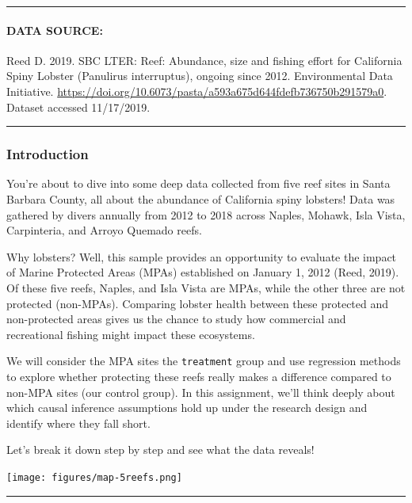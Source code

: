 \documentclass[
]{article}
\begin{document}
\begin{center}\rule{0.5\linewidth}{0.5pt}\end{center}

\paragraph{DATA SOURCE:}\label{data-source}

Reed D. 2019. SBC LTER: Reef: Abundance, size and fishing effort for
California Spiny Lobster (Panulirus interruptus), ongoing since 2012.
Environmental Data Initiative.
\url{https://doi.org/10.6073/pasta/a593a675d644fdefb736750b291579a0}.
Dataset accessed 11/17/2019.

\begin{center}\rule{0.5\linewidth}{0.5pt}\end{center}

\subsubsection{\texorpdfstring{\textbf{Introduction}}{Introduction}}\label{introduction}

You're about to dive into some deep data collected from five reef sites
in Santa Barbara County, all about the abundance of California spiny
lobsters! Data was gathered by divers annually from 2012 to 2018 across
Naples, Mohawk, Isla Vista, Carpinteria, and Arroyo Quemado reefs.

Why lobsters? Well, this sample provides an opportunity to evaluate the
impact of Marine Protected Areas (MPAs) established on January 1, 2012
(Reed, 2019). Of these five reefs, Naples, and Isla Vista are MPAs,
while the other three are not protected (non-MPAs). Comparing lobster
health between these protected and non-protected areas gives us the
chance to study how commercial and recreational fishing might impact
these ecosystems.

We will consider the MPA sites the \texttt{treatment} group and use
regression methods to explore whether protecting these reefs really
makes a difference compared to non-MPA sites (our control group). In
this assignment, we'll think deeply about which causal inference
assumptions hold up under the research design and identify where they
fall short.

Let's break it down step by step and see what the data reveals!

\texttt{[image: figures/map-5reefs.png]}

\begin{center}\rule{0.5\linewidth}{0.5pt}\end{center}
\end{document}
